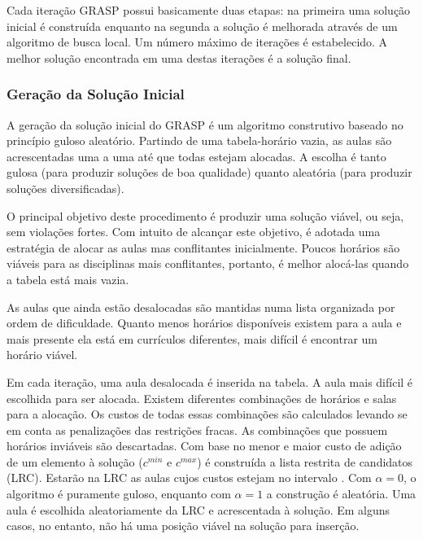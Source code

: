 \documentclass[11pt]{article}
\begin{document}
Cada iteração GRASP \cite{grasp_resende_ribeiro} possui basicamente duas etapas: na primeira uma solução inicial é construída enquanto na segunda a solução é melhorada através de um algoritmo de busca local. Um número máximo de iterações é estabelecido. A melhor solução encontrada em uma destas iterações é a solução final.

\subsubsection{Geração da Solução Inicial}

A geração da solução inicial do GRASP é um algoritmo construtivo baseado no princípio guloso aleatório. Partindo de uma tabela-horário vazia, as aulas são acrescentadas uma a uma até que todas estejam alocadas. A escolha é tanto gulosa (para produzir soluções de boa qualidade) quanto aleatória (para produzir soluções diversificadas).

O principal objetivo deste procedimento é produzir uma solução viável, ou seja, sem violações fortes. Com intuito de alcançar este objetivo, é adotada uma estratégia de alocar as aulas mas conflitantes inicialmente. Poucos horários são viáveis para as disciplinas mais conflitantes, portanto, é melhor alocá-las quando a tabela está mais vazia.

As aulas que ainda estão desalocadas são mantidas numa lista organizada por ordem de dificuldade. Quanto menos horários disponíveis existem para a aula e mais presente ela está em currículos diferentes, mais difícil é encontrar um horário viável.

Em cada iteração, uma aula desalocada é inserida na tabela. A aula mais difícil é escolhida para ser alocada. Existem diferentes combinações de horários e salas para a alocação. Os custos de todas essas combinações são calculados levando se em conta as penalizações das restrições fracas. As combinações que possuem horários inviáveis são descartadas. Com base no menor e maior custo de adição de um elemento à solução ($c^{min}$ e $c^{max}$) é construída a lista restrita de candidatos (LRC). Estarão na LRC as aulas cujos custos estejam no intervalo \begin{math} [c^{min}, c^{min}+\alpha(c^{max} - c^{min})]\end{math}. Com $\alpha=0$, o algoritmo é puramente guloso, enquanto com $\alpha=1$ a construção é aleatória. Uma aula é escolhida aleatoriamente da LRC e acrescentada à solução. Em alguns casos, no entanto, não há uma posição viável na solução para inserção. 
\end{document}
